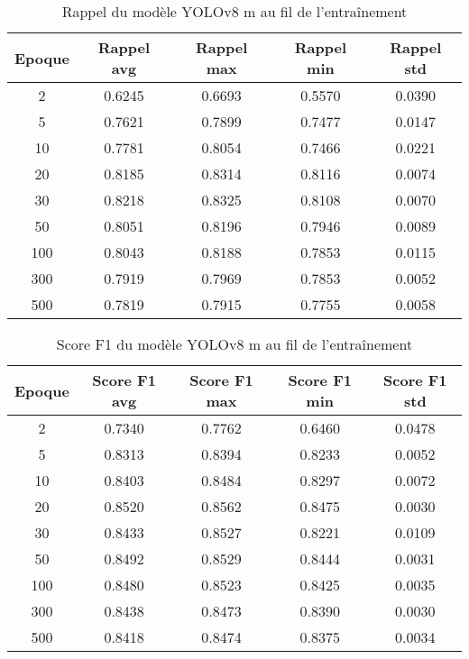 \begin{table}[!ht]
    \caption{Rappel du modèle YOLOv8 m au fil de l'entraînement}
    \label{tab:yolov8m_rappel}
    \centering
    \begin{tabular}{ |c||c|c|c|c|  }
        \hline
        \rowcolor{gray!50}
        Epoque & Rappel avg & Rappel max & Rappel min & Rappel std\\
        \hline
        2 & 0.6245 & 0.6693 & 0.5570 & 0.0390\\
        5 & 0.7621 & 0.7899 & 0.7477 & 0.0147\\
        10 & 0.7781 & 0.8054 & 0.7466 & 0.0221\\
        20 & 0.8185 & 0.8314 & 0.8116 & 0.0074\\
        30 & 0.8218 & 0.8325 & 0.8108 & 0.0070\\
        50 & 0.8051 & 0.8196 & 0.7946 & 0.0089\\
        100 & 0.8043 & 0.8188 & 0.7853 & 0.0115\\
        300 & 0.7919 & 0.7969 & 0.7853 & 0.0052\\
        500 & 0.7819 & 0.7915 & 0.7755 & 0.0058\\
        \hline
    \end{tabular}
\end{table}

\begin{table}[!ht]
    \caption{Score F1 du modèle YOLOv8 m au fil de l'entraînement}
    \label{tab:yolov8m_f1score}
    \centering
    \begin{tabular}{ |c||c|c|c|c|  }
        \hline
        \rowcolor{gray!50}
        Epoque & Score F1 avg & Score F1 max & Score F1 min & Score F1 std\\
        \hline
        2 & 0.7340 & 0.7762 & 0.6460 & 0.0478\\
        5 & 0.8313 & 0.8394 & 0.8233 & 0.0052\\
        10 & 0.8403 & 0.8484 & 0.8297 & 0.0072\\
        20 & 0.8520 & 0.8562 & 0.8475 & 0.0030\\
        30 & 0.8433 & 0.8527 & 0.8221 & 0.0109\\
        50 & 0.8492 & 0.8529 & 0.8444 & 0.0031\\
        100 & 0.8480 & 0.8523 & 0.8425 & 0.0035\\
        300 & 0.8438 & 0.8473 & 0.8390 & 0.0030\\
        500 & 0.8418 & 0.8474 & 0.8375 & 0.0034\\
        \hline
    \end{tabular}
\end{table}

